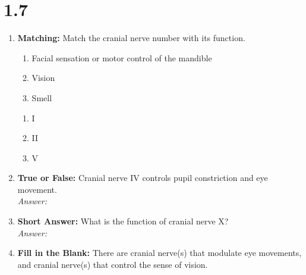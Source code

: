 \section*{1.7 \squigglyline}
\begin{enumerate}[label=\textbf{Q1.7.\arabic*}]
      \item \textbf{Matching:} Match the cranial nerve number with its function.
            \begin{wordbox}
                  \begin{enumerate}[label=(\roman*)]
                        \item Facial sensation or motor control of the mandible
                        \item Vision
                        \item Smell
                  \end{enumerate}
            \end{wordbox}
            \begin{enumerate}[label=(\alph*)]
                  \item I \quad \dotfill \quad \underline{\hspace{3cm}}\\[0.5em]
                  \item II \quad \dotfill \quad \underline{\hspace{3cm}}\\[0.5em]
                  \item V \quad \dotfill \quad \underline{\hspace{3cm}}
            \end{enumerate}

      \item \textbf{True or False:} Cranial nerve IV controls pupil constriction and eye movement. \\
            \textit{Answer:} %

      \item \textbf{Short Answer:} What is the function of cranial nerve X? \\
            \textit{Answer:} \\ %

      \item \textbf{Fill in the Blank:} There are \underline{\hspace{3cm}} cranial nerve(s) that modulate eye movements, and \underline{\hspace{3cm}} cranial nerve(s) that control the sense of vision. \\


\end{enumerate}
